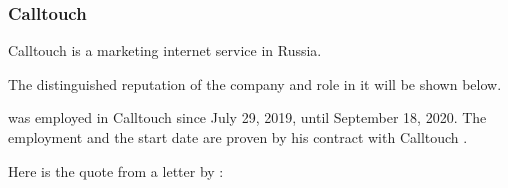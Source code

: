 \subsubsection{Calltouch}
\label{subsubsec:RoleCalltouch}


Calltouch is a marketing internet service in Russia.

The distinguished reputation of the company and \mrls role in it
will be shown below.


\mrl was employed in Calltouch since July 29, 2019, until September 18, 2020.
The employment and the start date are proven by his contract with Calltouch .



Here is the quote from a letter by \MrCalltouchT:

